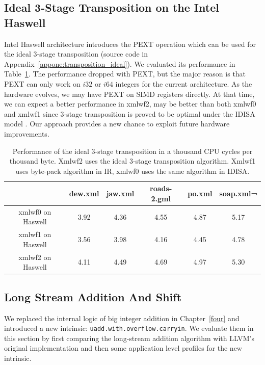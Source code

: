 \subsection{Ideal 3-Stage Transposition on the Intel Haswell}
Intel Haswell architecture introduces the PEXT operation which can be used for the ideal 3-stage transposition (source code in Appendix~\ref{appone:transposition_ideal}). We evaluated its performance in Table~\ref{table:PEXT_transposition}. The performance dropped with PEXT, but the major reason is that PEXT can only work on $i32$ or $i64$ integers for the current architecture. As the hardware evolves, we may have PEXT on SIMD registers directly. At that time, we can expect a better performance in xmlwf2, may be better than both xmlwf0 and xmlwf1 since 3-stage transposition is proved to be optimal under the IDISA model \cite{inductive_doubling_principle}. Our approach provides a new chance to exploit future hardware improvements.

\begin{table}[h]
\centering
\begin{tabular}{|c|c|c|c|c|c|}
\hline
        & dew.xml  &  jaw.xml  &  roads-2.gml  &  po.xml  & soap.xml¬ \\\hline
xmlwf0 on Haswell   &  3.92   &   4.36   &   4.55   &   4.87   &   5.17 \\ \hline
xmlwf1 on Haswell &   3.56   &   3.98   &   4.16   &   4.45   &   4.78 \\ \hline
xmlwf2 on Haswell & 4.11   &    4.49   &    4.69   &    4.97   &   5.30 \\ \hline
\end{tabular}
\caption[Ideal 3-Stage Transposition with PEXT]{Performance of the ideal 3-stage transposition in a thousand CPU cycles per thousand byte. Xmlwf2 uses the ideal 3-stage transposition algorithm. Xmlwf1 uses byte-pack algorithm in IR, xmlwf0 uses the same algorithm in IDISA.}
\label{table:PEXT_transposition}
\end{table}

\subsection{Long Stream Addition And Shift}
We replaced the internal logic of big integer addition in Chapter~\ref{four} and introduced a new intrinsic: {\tt uadd.with.overflow.carryin}. We evaluate them in this section by first comparing the long-stream addition algorithm with LLVM's original implementation and then some application level profiles for the new intrinsic.

